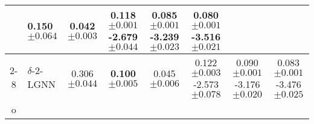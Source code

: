 \documentclass{article}
\theoremstyle{definition}
\begin{document}
\begin{table}[t]
{\begin{tabular}{@{}c <{\enspace}@{}lcccccc@{}}
			& 0.150 \scriptsize $\pm 0.064 $ & \textbf{0.042} {\scriptsize $\pm 0.003$}   & \textbf{0.118}  {\scriptsize $\pm 0.001 $} -2.679 {\scriptsize $\pm   0.044$}  & \textbf{0.085} {\scriptsize $\pm 0.001$} -3.239 {\scriptsize $\pm 0.023$} &\textbf{0.080}                                                                                                                                                                                                                                                                                                                                                                                                                                                                                  {\scriptsize $\pm 0.001$} -3.516 {\scriptsize $\pm 0.021$} \\
			
			
			\cmidrule{2-8}	
			\multirow{2}{*}{\rotatebox{90}{}}   & $\delta$-$2$-\textsf{LGNN} &  0.306 \scriptsize $\pm0.044$
			& \textbf{0.100} \scriptsize $\pm 0.005$  & 0.045  \scriptsize $\pm 0.006$ & 0.122 {\scriptsize $\pm 0.003$} -2.573 {\scriptsize $\pm 0.078$}  & 0.090 {\scriptsize $\pm 0.001$} -3.176 {\scriptsize $\pm 0.020$} & 0.083 {\scriptsize $\pm 0.001$} -3.476  {\scriptsize $\pm 0.025$} \\
			\bottomrule
o	\end{tabular}}
\end{table}
\end{document}
